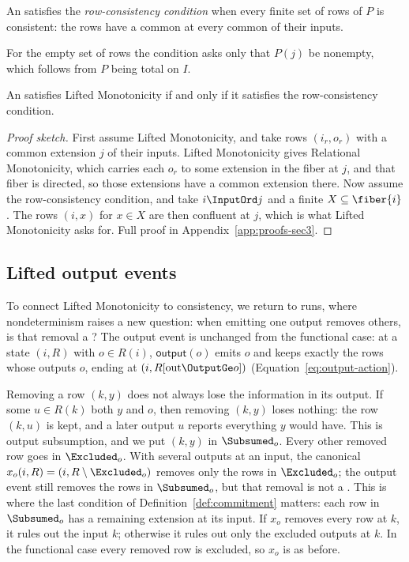 \begin{definition}
\label{def:common-expansion-condition}
An \spectype satisfies the \emph{row-consistency condition} when every finite set of rows of $P$ is consistent: the rows have a common \outnoun at every common \indesc of their inputs.
\end{definition}

For the empty set of rows the condition asks only that $P(j)$ be nonempty, which
follows from $P$ being total on $I$.

\begin{proposition}
\label{prop:common-expansion-form}
An \spectype satisfies Lifted Monotonicity if and only
if it satisfies the row-consistency condition.
\end{proposition}

\begin{proof}[Proof sketch]
First assume Lifted Monotonicity, and take rows $(i_r,o_r)$ with a common extension $j$ of their inputs.  Lifted Monotonicity gives Relational Monotonicity, which carries each $o_r$ to some extension in the fiber at $j$, and that fiber is directed, so those extensions have a common extension there.  Now assume the row-consistency
condition, and take $i\InputOrd j$ and a finite $X\subseteq\fiber{i}$.  The
rows $(i,x)$ for $x\in X$ are then confluent at $j$, which is what Lifted Monotonicity asks for.  Full proof in
Appendix~\ref{app:proofs-sec3}.
\end{proof}

\subsection{Lifted output events}
\label{sec:lifted-output-events}

To connect Lifted Monotonicity to consistency, we return to runs, where
nondeterminism raises a new question: when emitting one output removes others,
is that removal a \commitment?  The output event is unchanged from the
functional case: at a state $(i,R)$ with $o\in R(i)$, $\mathsf{output}(o)$ emits
$o$ and keeps exactly the rows whose outputs \outrelbase $o$, ending at
$(i,R[\mathrm{out}\OutputGe o])$ (Equation~\ref{eq:output-action}).

Removing a row $(k,y)$ does not always lose the information in its output.  If some $u\in R(k)$ \outrel both $y$ and $o$, then removing $(k,y)$ loses nothing: the row $(k,u)$ is kept, and a later output $u$ reports everything $y$
would have.  This is output subsumption, and we put $(k,y)$ in $\Subsumed_o$.
Every other removed row goes in $\Excluded_o$.  With several outputs at an
input, the canonical \commitment $x_o(i,R)=(i,R\setminus\Excluded_o)$ removes
only the rows in $\Excluded_o$; the output event still removes the rows in
$\Subsumed_o$, but that removal is not a \commitment.  This is where the last
condition of Definition~\ref{def:commitment} matters: each row in
$\Subsumed_o$ has a remaining extension at its input.  If $x_o$ removes
every row at $k$, it rules out the input $k$; otherwise it rules out only the
excluded outputs at $k$.  In the functional case every removed row is excluded,
so $x_o$ is as before.

